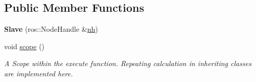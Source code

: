 \subsection*{Public Member Functions}
\begin{DoxyCompactItemize}
\item 
{\bfseries Slave} (ros\+::\+Node\+Handle \&\hyperlink{classController_a24e3d3c2536f6ed29018bad1fd53dae2}{nh})\hypertarget{classSlave_a855a824b462dd05eddaa8d53b27faea4}{}\label{classSlave_a855a824b462dd05eddaa8d53b27faea4}

\item 
void \hyperlink{classSlave_a9b5d1d499c7bd05d5260fbe5b8afbbb5}{scope} ()\hypertarget{classSlave_a9b5d1d499c7bd05d5260fbe5b8afbbb5}{}\label{classSlave_a9b5d1d499c7bd05d5260fbe5b8afbbb5}

\begin{DoxyCompactList}\small\item\em A Scope within the execute function. Repeating calculation in inheriting classes are implemented here. \end{DoxyCompactList}\end{DoxyCompactItemize}

